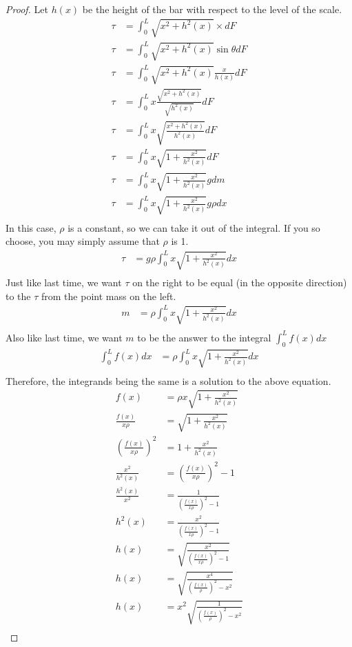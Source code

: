 \documentclass[letterpaper, 12pt]{article}
\begin{document}
\begin{proof}
	Let $h(x)$ be the height of the bar with respect to the level of the scale.
	\begin{align*}
		\tau &= \int_0^L \sqrt{x^2 + h^2(x)}\times dF\\
		\tau &= \int_0^L \sqrt{x^2 + h^2(x)}\sin\theta dF\\
		\tau &= \int_0^L \sqrt{x^2 + h^2(x)}\frac{x}{h(x)} dF\\
		\tau &= \int_0^L x\frac{\sqrt{x^2 + h^2(x)}}{\sqrt{h^2(x)}}dF\\
		\tau &= \int_0^L x\sqrt{\frac{x^2 + h^2(x)}{h^2(x)}}dF\\
		\tau &= \int_0^L x\sqrt{1 + \frac{x^2}{h^2(x)}}dF\\
		\tau &= \int_0^L x\sqrt{1 + \frac{x^2}{h^2(x)}}gdm\\
		\tau &= \int_0^L x\sqrt{1 + \frac{x^2}{h^2(x)}}g\rho dx\\
	\end{align*}
	In this case, $\rho$ is a constant, so we can take it out of the integral.
	If you so choose, you may simply assume that $\rho$ is 1.
	\begin{align*}
		\tau &= g\rho\int_0^L x\sqrt{1 + \frac{x^2}{h^2(x)}}dx\\
	\end{align*}
	Just like last time, we want $\tau$ on the right to be equal (in the opposite direction) to the $\tau$ from the point mass on the left.
	\begin{align*}
		m &= \rho\int_0^L x\sqrt{1 + \frac{x^2}{h^2(x)}}dx\\
	\end{align*}
	Also like last time, we want $m$ to be the answer to the integral $\int_0^L f(x) dx$
	\begin{align*}
		\int_0^Lf(x)dx &= \rho\int_0^L x\sqrt{1 + \frac{x^2}{h^2(x)}}dx\\
	\end{align*}
	Therefore, the integrands being the same is a solution to the above equation.
	\begin{align*}
		f(x) &= \rho x\sqrt{1 + \frac{x^2}{h^2(x)}}\\
		\frac{f(x)}{x\rho} &= \sqrt{1 + \frac{x^2}{h^2(x)}}\\
		(\frac{f(x)}{x\rho})^2 &= 1 + \frac{x^2}{h^2(x)}\\
		\frac{x^2}{h^2(x)} &= (\frac{f(x)}{x\rho})^2 - 1\\
		\frac{h^2(x)}{x^2} &= \frac{1}{(\frac{f(x)}{x\rho})^2 - 1}\\
		h^2(x) &= \frac{x^2}{(\frac{f(x)}{x\rho})^2 - 1}\\
		h(x) &= \sqrt{\frac{x^2}{(\frac{f(x)}{x\rho})^2 - 1}}\\
		h(x) &= \sqrt{\frac{x^4}{(\frac{f(x)}{\rho})^2 - x^2}}\\
		h(x) &= x^2\sqrt{\frac{1}{(\frac{f(x)}{\rho})^2 - x^2}}\\
	\end{align*}
\end{proof}
\end{document}
